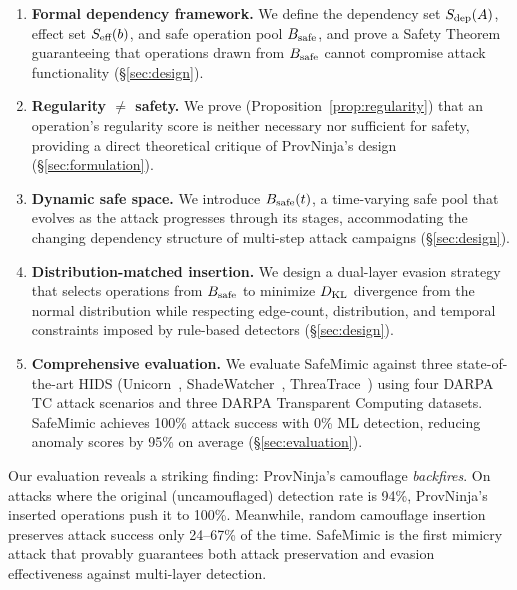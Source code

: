 \begin{enumerate}
    \item \textbf{Formal dependency framework.} We define the dependency set $S_{\text{dep}}(A)$, effect set $S_{\text{eff}}(b)$, and safe operation pool $B_{\text{safe}}$, and prove a Safety Theorem guaranteeing that operations drawn from $B_{\text{safe}}$ cannot compromise attack functionality (\S\ref{sec:design}).

    \item \textbf{Regularity $\neq$ safety.} We prove (Proposition~\ref{prop:regularity}) that an operation's regularity score is neither necessary nor sufficient for safety, providing a direct theoretical critique of ProvNinja's design (\S\ref{sec:formulation}).

    \item \textbf{Dynamic safe space.} We introduce $B_{\text{safe}}(t)$, a time-varying safe pool that evolves as the attack progresses through its stages, accommodating the changing dependency structure of multi-step attack campaigns (\S\ref{sec:design}).

    \item \textbf{Distribution-matched insertion.} We design a dual-layer evasion strategy that selects operations from $B_{\text{safe}}$ to minimize $D_{\text{KL}}$ divergence from the normal distribution while respecting edge-count, distribution, and temporal constraints imposed by rule-based detectors (\S\ref{sec:design}).

    \item \textbf{Comprehensive evaluation.} We evaluate SafeMimic against three state-of-the-art HIDS (Unicorn~\cite{unicorn}, ShadeWatcher~\cite{shadewatcher}, ThreaTrace~\cite{threatrace}) using four DARPA TC attack scenarios and three DARPA Transparent Computing datasets. SafeMimic achieves 100\% attack success with 0\% ML detection, reducing anomaly scores by 95\% on average (\S\ref{sec:evaluation}).
\end{enumerate}

\noindent
Our evaluation reveals a striking finding: ProvNinja's camouflage \emph{backfires}.
On attacks where the original (uncamouflaged) detection rate is 94\%, ProvNinja's inserted operations push it to 100\%.
Meanwhile, random camouflage insertion preserves attack success only 24--67\% of the time.
SafeMimic is the first mimicry attack that provably guarantees both attack preservation and evasion effectiveness against multi-layer detection.
